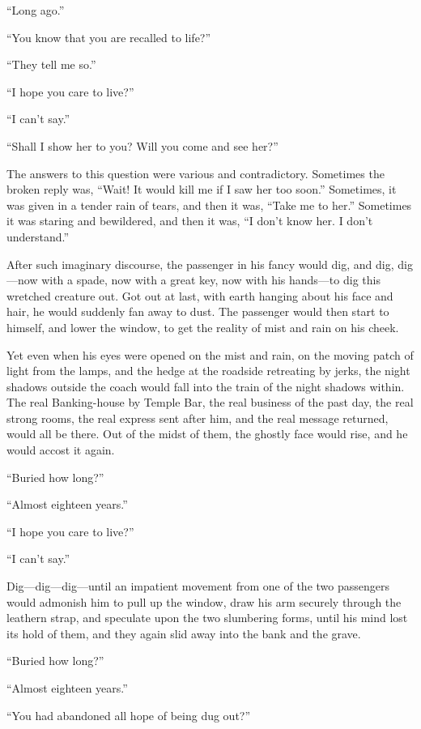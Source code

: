 ``Long ago.''

``You know that you are recalled to life?''

``They tell me so.''

``I hope you care to live?''

``I can't say.''

``Shall I show her to you?  Will you come and see her?''

The answers to this question were various and contradictory.
Sometimes the broken reply was, ``Wait!  It would kill me if I saw
her too soon.''  Sometimes, it was given in a tender rain of tears,
and then it was, ``Take me to her.''  Sometimes it was staring and
bewildered, and then it was, ``I don't know her.  I don't understand.''

After such imaginary discourse, the passenger in his fancy would dig,
and dig, dig---now with a spade, now with a great key, now with his
hands---to dig this wretched creature out.  Got out at last, with
earth hanging about his face and hair, he would suddenly fan away to
dust.  The passenger would then start to himself, and lower the
window, to get the reality of mist and rain on his cheek.

Yet even when his eyes were opened on the mist and rain, on the
moving patch of light from the lamps, and the hedge at the roadside
retreating by jerks, the night shadows outside the coach would fall
into the train of the night shadows within.  The real Banking-house
by Temple Bar, the real business of the past day, the real strong
rooms, the real express sent after him, and the real message returned,
would all be there.  Out of the midst of them, the ghostly face would
rise, and he would accost it again.

``Buried how long?''

``Almost eighteen years.''

``I hope you care to live?''

``I can't say.''

Dig---dig---dig---until an impatient movement from one of the two
passengers would admonish him to pull up the window, draw his arm
securely through the leathern strap, and speculate upon the two
slumbering forms, until his mind lost its hold of them, and they
again slid away into the bank and the grave.

``Buried how long?''

``Almost eighteen years.''

``You had abandoned all hope of being dug out?''

